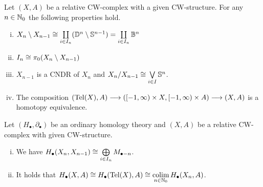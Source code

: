 
	\begin{lemma}
		Let $(X,A)$ be a relative CW-complex with a given CW-structure. For any $n \in \mathbb{N}_0$ the following properties hold. 
		\begin{enumerate}[(i)]
			\item{
				$X_n \setminus X_{n-1} \cong \coprod \limits_{i \in I_n} (\mathbb{D}^n \setminus \mathbb{S}^{n-1}) = \coprod \limits_{i \in I_n} \mathbb{B}^n$
			}
			\item{
				$I_n \cong \pi_0(X_n \setminus X_{n-1})$
			}
			\item{
				$X_{n-1}$ is a CNDR of $X_n$ and $X_n / X_{n-1} \cong \operatorname*{\bigvee} \limits_{i \in I} \mathbb{S}^n$.

			}
			\item{
				The composition $(\operatorname{Tel}(X),A) --> ([-1,\infty)\times X,[-1,\infty)\times A) --> (X,A)$ is a homotopy equivalence.
			}
		\end{enumerate}
	\end{lemma}

	\begin{corollary}
		Let $(H_\bullet, \partial_\bullet)$ be an ordinary homology theory and $(X,A)$ be a relative CW-complex with given CW-structure.
		\begin{enumerate}[(i)]
			\item{
				We have $H_\bullet(X_n,X_{n-1}) \cong \bigoplus \limits_{i \in I_n}M_{\bullet-n}$.%
			}
			\item{
				It holds that $H_\bullet(X,A) \cong H_\bullet(\operatorname{Tel} (X), A) \cong \operatorname*{colim} \limits_{n \in \mathbb{N}_0} H_\bullet(X_n,A)$.
			}
		\end{enumerate}
	\end{corollary}


